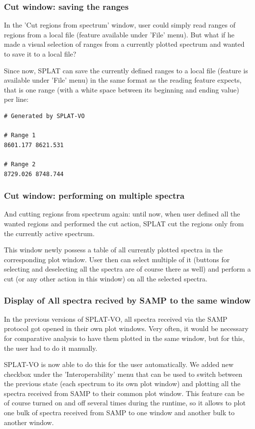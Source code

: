 \documentclass[final,authoryear,5p,times,twocolumn]{elsarticle}
\begin{document}
\subsubsection{Cut window: saving the ranges}

In the 'Cut regions from spectrum' window, user could simply read
ranges of regions from a local file (feature available under 'File'
menu). But what if he made a visual selection of ranges from a
currently plotted spectrum and wanted to save it to a local file?

Since now, SPLAT can save the currently defined
ranges to a local file (feature is available under 'File' menu) in the
same format as the reading feature expects, that is one range (with a
white space between its beginning and ending value) per line:

\begin{verbatim}
# Generated by SPLAT-VO

# Range 1
8601.177 8621.531

# Range 2
8729.026 8748.744
\end{verbatim}

\subsubsection{Cut window: performing on multiple spectra}

And cutting regions from spectrum again: until now, when user defined
all the wanted regions and performed the cut action, SPLAT cut the
regions only from the currently active spectrum.

This window newly possess a table of all
currently plotted spectra in the corresponding plot window. User then
can select multiple of it (buttons for selecting and deselecting all
the spectra are of course there as well) and perform a cut (or any
other action in this window) on all the selected spectra.

\subsubsection{Display of All  spectra recived by SAMP to the same  window}

In the previous versions of SPLAT-VO, all spectra received via the SAMP
protocol got opened in their own plot windows. Very often, it would be
necessary for comparative analysis to have them plotted in the same
window, but for this, the user had to do it manually.

SPLAT-VO is now able to do this
for the user automatically. We added new checkbox under the
'Interoperability' menu that can be used to switch between the previous
state (each spectrum to its own plot window) and plotting all the
spectra received from SAMP to their common plot window. This feature
can be of course turned on and off several times during the runtime,
so it allows to plot one bulk of spectra received from SAMP to one
window and another bulk to another window.
\end{document}
